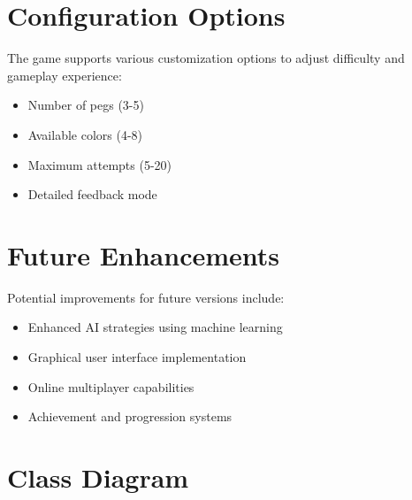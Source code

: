 \documentclass[english,a4paper]{article}
\begin{document}
\section{Configuration Options}
The game supports various customization options to adjust difficulty and gameplay experience:
\begin{itemize}
\item Number of pegs (3-5)
\item Available colors (4-8)
\item Maximum attempts (5-20)
\item Detailed feedback mode
\end{itemize}

\section{Future Enhancements}
Potential improvements for future versions include:
\begin{itemize}
\item Enhanced AI strategies using machine learning
\item Graphical user interface implementation
\item Online multiplayer capabilities
\item Achievement and progression systems
\end{itemize}


\section{Class Diagram}
\end{document}
